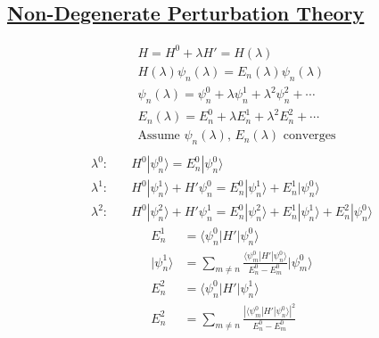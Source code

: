\subsection*{\underline{Non-Degenerate Perturbation Theory}}
\begin{align}
     & H = H^0 + \lambda H' = H(\lambda)                                         \\
     & H(\lambda) \psi_n (\lambda) = E_n (\lambda) \psi_n (\lambda)              \\
     & \psi_n(\lambda) = \psi_n^0 + \lambda \psi_n^1 + \lambda^2 \psi_n^2+\cdots \\
     & E_n(\lambda) = E_n^0 + \lambda E_n^1 + \lambda^2 E_n^2 + \cdots           \\
     & \text{Assume }\psi_n(\lambda), \, E_n(\lambda) \text{ converges}          \\
\end{align}
\begin{align}
    \lambda^0: \quad & H^0|\psi_n^0\rangle = E_n^0 |\psi_n^0\rangle             \\
    \lambda^1: \quad & H^0|\psi_n^1\rangle + H'\psi_n^0 = E_n^0|\psi_n^1\rangle
    + E_n^1|\psi_n^0\rangle                                                     \\
    \lambda^2: \quad & H^0|\psi_n^2\rangle + H'\psi_n^1 = E_n^0|\psi_n^2\rangle
    + E_n^1|\psi_n^1\rangle + E_n^2|\psi_n^0\rangle
\end{align}
\begin{align}
    E_n^1            & = \langle\psi_n^0|H'|\psi_n^0\rangle                            \\
    |\psi_n^1\rangle & = \sum_{m\ne n} \frac{\langle \psi_m^0|H'|
    \psi_n^0\rangle}{E_n^0 - E_m^0} |\psi_m^0\rangle                                   \\
    E_n^2            & = \langle \psi_n^0 | H' | \psi_n^1\rangle                       \\
    E_n^2            & = \sum_{m\ne n} \frac{\left| \langle\psi_m^0|H'|\psi_n^0\rangle
        \right|^2}{E_n^0 - E_m^0}
\end{align}


